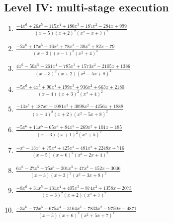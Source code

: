 \documentclass[11pt,oneside]{book}
\begin{document}
\subsection*{Level IV: multi-stage execution}
\begin{enumerate}[leftmargin=*,label=\textbf{\arabic*.},itemsep=0.65\baselineskip]
\item $\displaystyle \frac{- 4 x^{6} + 26 x^{5} - 115 x^{4} + 180 x^{3} - 187 x^{2} - 284 x + 999}{\left(x - 5\right) \left(x + 2\right)^{2} \left(x^{2} - x + 7\right)^{2}}$
\item $\displaystyle \frac{- 2 x^{6} + 17 x^{5} - 16 x^{4} + 78 x^{3} - 30 x^{2} + 82 x - 79}{\left(x - 3\right) \left(x - 1\right)^{2} \left(x^{2} + 4\right)^{2}}$
\item $\displaystyle \frac{4 x^{6} - 50 x^{5} + 261 x^{4} - 785 x^{3} + 1573 x^{2} - 2105 x + 1386}{\left(x - 3\right)^{2} \left(x + 2\right) \left(x^{2} - 5 x + 8\right)^{2}}$
\item $\displaystyle \frac{- 5 x^{6} + 4 x^{5} + 90 x^{4} + 199 x^{3} + 936 x^{2} + 663 x + 2180}{\left(x - 4\right) \left(x + 3\right)^{2} \left(x^{2} + 4\right)^{2}}$
\item $\displaystyle \frac{- 13 x^{5} + 187 x^{4} - 1081 x^{3} + 3098 x^{2} - 4256 x + 1888}{\left(x - 4\right)^{2} \left(x + 2\right) \left(x^{2} - 5 x + 8\right)^{2}}$
\item $\displaystyle \frac{- 5 x^{6} + 11 x^{5} - 65 x^{4} + 84 x^{3} - 269 x^{2} + 101 x - 185}{\left(x - 3\right) \left(x + 1\right)^{2} \left(x^{2} + 5\right)^{2}}$
\item $\displaystyle \frac{- x^{6} - 13 x^{5} + 75 x^{4} + 425 x^{3} - 481 x^{2} + 2248 x + 716}{\left(x - 5\right) \left(x + 6\right)^{2} \left(x^{2} - 2 x + 4\right)^{2}}$
\item $\displaystyle \frac{6 x^{6} - 27 x^{5} + 75 x^{4} - 201 x^{3} + 47 x^{2} - 152 x - 3036}{\left(x - 3\right) \left(x + 3\right)^{2} \left(x^{2} - 3 x + 8\right)^{2}}$
\item $\displaystyle \frac{- 8 x^{6} + 31 x^{5} - 131 x^{4} + 405 x^{3} - 874 x^{2} + 1358 x - 2073}{\left(x - 3\right)^{2} \left(x + 2\right) \left(x^{2} + 7\right)^{2}}$
\item $\displaystyle \frac{- 3 x^{6} - 72 x^{5} - 675 x^{4} - 3164 x^{3} - 7833 x^{2} - 9750 x - 4871}{\left(x + 5\right) \left(x + 6\right)^{2} \left(x^{2} + 5 x + 7\right)^{2}}$
\end{enumerate}
\end{document}
